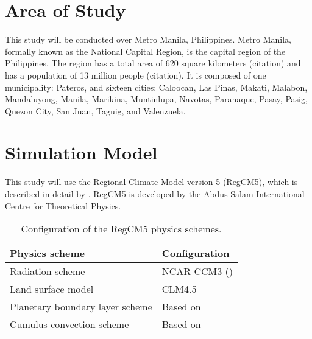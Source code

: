 \section{Area of Study}
	This study will be conducted over Metro Manila, Philippines.
	Metro Manila, formally known as the National Capital Region, is the capital region of the Philippines.
	The region has a total area of 620 square kilometers (citation)
		and has a population of 13 million people (citation).
	It is composed of one municipality: Pateros, and sixteen cities:
		Caloocan,
		Las Pinas,
		Makati,
		Malabon,
		Mandaluyong,
		Manila,
		Marikina,
		Muntinlupa,
		Navotas,
		Paranaque,
		Pasay,
		Pasig,
		Quezon City,
		San Juan,
		Taguig, and
		Valenzuela.
		
\section{Simulation Model}
	This study will use the Regional Climate Model version 5 (RegCM5), which is described in detail by \textcite{Giorgi2023}.
	RegCM5 is developed by the Abdus Salam International Centre for Theoretical Physics.
	
	\begin{table}
		\label{tab:physics-schemes}
		\caption{Configuration of the RegCM5 physics schemes.}
		\centering
		\begin{tabular}{l l}
			\hline \hline
			Physics scheme & Configuration\\
			\hline
			Radiation scheme & NCAR CCM3 (\cite{Kiehl1996}) \\
			Land surface model & CLM4.5 \\
			Planetary boundary layer scheme & Based on \textcite{Holtslag1990}\\
			Cumulus convection scheme & Based on \textcite{Emanuel1991}\\
			\hline
		\end{tabular}		
	\end{table}